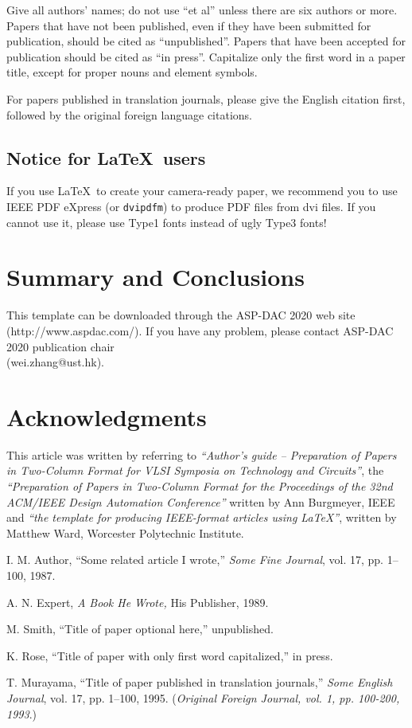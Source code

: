 \documentclass[conference]{IEEEtran}
\begin{document}
Give all authors' names; do not use ``et al'' unless there are six
authors or more. Papers that have not been published, even if they have
been submitted for publication, should be cited as
``unpublished''\cite{unpub}.  Papers that have been accepted for
publication should be cited as ``in press''\cite{inpress}.
Capitalize only the first word in a paper title, except for proper nouns
and element symbols.

For papers published in translation journals, please give the English
citation first, followed by the original foreign language
citations\cite{trans}.

\subsection{Notice for \LaTeX\ users}

If you use \LaTeX\ to create your camera-ready paper, we recommend you
to use IEEE PDF eXpress (or {\tt dvipdfm}) to produce PDF files from dvi 
files. If you cannot use it, please use Type1 fonts instead of ugly Type3 fonts!

\section{Summary and Conclusions}

This template can be downloaded through the ASP-DAC 2020 web site
(http://www.aspdac.com/). If you have any problem, please contact ASP-DAC
2020 publication chair\\
(wei.zhang@ust.hk).

\section*{\sc Acknowledgments}
This article was written by referring to {\em ``Author's guide --
	Preparation of Papers in Two-Column Format for VLSI Symposia on
	Technology and Circuits''}, the {\em ``Preparation of Papers in
	Two-Column Format for the Proceedings of the 32nd ACM/IEEE Design
	Automation Conference''} written by Ann Burgmeyer, IEEE and {\em ``the
	template for producing IEEE-format articles using \LaTeX''}, written by
Matthew Ward, Worcester Polytechnic Institute.

\begin{thebibliography}{9}
	\footnotesize
	I. M. Author,
	``Some related article I wrote,''
	{\em Some Fine Journal}, vol. 17, pp. 1--100, 1987.
	
	A. N. Expert,
	{\em A Book He Wrote,}
	His Publisher, 1989.
	
	M. Smith,
	``Title of paper optional here,''
	unpublished.
	
	K. Rose,
	``Title of paper with only first word capitalized,''	%
	in press.
	
	T. Murayama,
	``Title of paper published in translation journals,''	%
	{\em Some English Journal}, vol. 17, pp. 1--100, 1995.	%
	({\em Original Foreign Journal, vol. 1, pp. 100-200, 1993}.)	%
	
\end{thebibliography}
\end{document}
